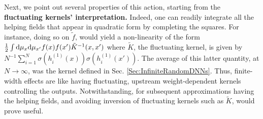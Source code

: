 Next, we point out several properties of this action, starting from the {\bf fluctuating kernels' interpretation.} Indeed, one can readily integrate all the helping fields that appear in quadratic form by completing the squares. For instance, doing so on $\tilde{f}$, would yield a non-linearity of the form $\frac{1}{2}\int \text{d}\mu_x \text{d}\mu_{x'} f(x) f(x') \tilde{K}^{-1}(x,x')$ where $\tilde{K}$, the fluctuating kernel, is given by $N^{-1}\sum_{i=1}^N \sigma(h^{(1)}_i(x))\sigma(h^{(1)}_i(x'))$. The average of this latter quantity, at $N\rightarrow \infty$, was the kernel defined in Sec. \ref{Sec:InfiniteRandomDNNs}. Thus, finite-width effects are like having fluctuating, upstream weight-dependent kernels controlling the outputs. Notwithstanding, for subsequent approximations having the helping fields, and avoiding inversion of fluctuating kernels such as $\tilde{K}$, would prove useful. 

